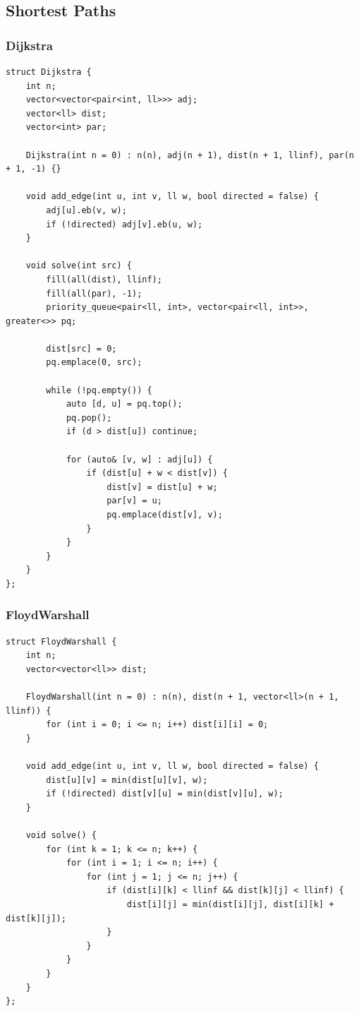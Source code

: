 \documentclass[9pt,a4paper,twocolumn]{extarticle}
\begin{document}
\subsection{Shortest Paths}

\filbreak
\subsubsection{Dijkstra}
\nopagebreak
\begin{lstlisting}
struct Dijkstra {
    int n;
    vector<vector<pair<int, ll>>> adj;
    vector<ll> dist;
    vector<int> par;

    Dijkstra(int n = 0) : n(n), adj(n + 1), dist(n + 1, llinf), par(n + 1, -1) {}

    void add_edge(int u, int v, ll w, bool directed = false) {
        adj[u].eb(v, w);
        if (!directed) adj[v].eb(u, w);
    }

    void solve(int src) {
        fill(all(dist), llinf);
        fill(all(par), -1);
        priority_queue<pair<ll, int>, vector<pair<ll, int>>, greater<>> pq;

        dist[src] = 0;
        pq.emplace(0, src);

        while (!pq.empty()) {
            auto [d, u] = pq.top();
            pq.pop();
            if (d > dist[u]) continue;

            for (auto& [v, w] : adj[u]) {
                if (dist[u] + w < dist[v]) {
                    dist[v] = dist[u] + w;
                    par[v] = u;
                    pq.emplace(dist[v], v);
                }
            }
        }
    }
};
\end{lstlisting}

\filbreak
\subsubsection{FloydWarshall}
\nopagebreak
\begin{lstlisting}
struct FloydWarshall {
    int n;
    vector<vector<ll>> dist;

    FloydWarshall(int n = 0) : n(n), dist(n + 1, vector<ll>(n + 1, llinf)) {
        for (int i = 0; i <= n; i++) dist[i][i] = 0;
    }

    void add_edge(int u, int v, ll w, bool directed = false) {
        dist[u][v] = min(dist[u][v], w);
        if (!directed) dist[v][u] = min(dist[v][u], w);
    }

    void solve() {
        for (int k = 1; k <= n; k++) {
            for (int i = 1; i <= n; i++) {
                for (int j = 1; j <= n; j++) {
                    if (dist[i][k] < llinf && dist[k][j] < llinf) {
                        dist[i][j] = min(dist[i][j], dist[i][k] + dist[k][j]);
                    }
                }
            }
        }
    }
};
\end{lstlisting}
\end{document}
